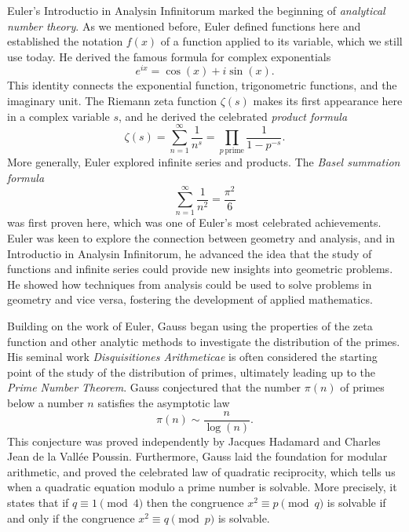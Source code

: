 \documentclass{article}
\theoremstyle{definition}
\theoremstyle{remark}
\begin{document}
Euler's Introductio in Analysin Infinitorum marked the beginning of \emph{analytical number theory}. As we mentioned before, Euler defined functions here and established the notation $f(x)$ of a function applied to its variable, which we still use today. He derived the famous formula for complex exponentials
\begin{equation*}
  e^{ix}=\cos(x) + i \sin(x).
\end{equation*}
This identity connects the exponential function, trigonometric functions, and the imaginary unit. The Riemann zeta function $\zeta(s)$ makes its first appearance here in a complex variable $s$, and he derived the celebrated \emph{product formula}
\begin{equation*}
  \zeta(s)=\sum_{n=1}^{\infty}\frac{1}{n^s}=\prod_{p\,\mathrm{prime}}\frac{1}{1-p^{-s}}.
\end{equation*}
More generally, Euler explored infinite series and products. The \emph{Basel summation formula}
\begin{equation*}
  \sum_{n=1}^\infty \frac{1}{n^2}=\frac{\pi^2}{6}
\end{equation*}
was first proven here, which was one of Euler's most celebrated achievements. Euler was keen to explore the connection between geometry and analysis, and in Introductio in Analysin Infinitorum, he advanced the idea that the study of functions and infinite series could provide new insights into geometric problems. He showed how techniques from analysis could be used to solve problems in geometry and vice versa, fostering the development of applied mathematics.

Building on the work of Euler, Gauss began using the properties of the zeta function and other analytic methods to investigate the distribution of the primes. His seminal work \emph{Disquisitiones Arithmeticae} \cite{gauss1986} is often considered the starting point of the study of the distribution of primes, ultimately leading up to the \emph{Prime Number Theorem}. Gauss conjectured that the number $\pi(n)$ of primes below a number $n$ satisfies the asymptotic law
\begin{equation*}
  \pi(n)\sim\frac{n}{\log(n)}.
\end{equation*}
This conjecture was proved independently by Jacques Hadamard and Charles Jean de la Vallée Poussin. Furthermore, Gauss laid the foundation for modular arithmetic, and proved the celebrated law of quadratic reciprocity, which tells us when a quadratic equation modulo a prime number is solvable. More precisely, it states that if $q\equiv 1\pmod{4}$ then the congruence $x^2\equiv p \pmod{q}$ is solvable if and only if the congruence $x^2\equiv q\pmod{p}$ is solvable.
\end{document}
